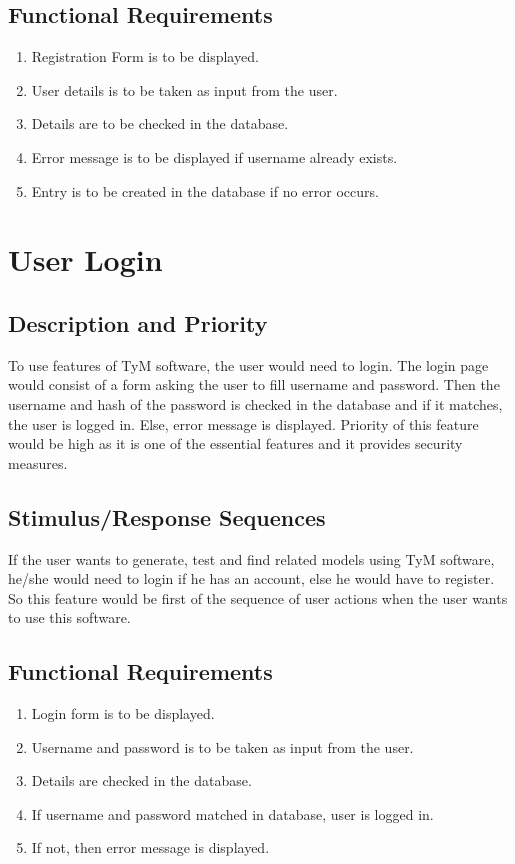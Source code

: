 \documentclass{scrreprt}
\begin{document}
\subsection{Functional Requirements}
\begin{enumerate}
\item Registration Form is to be displayed.
\item User details is to be taken as input from the user.
\item Details are to be checked in the database.
\item Error message is to be displayed if username already exists.
\item Entry is to be created in the database if no error occurs.
\end{enumerate}

\section{User Login}

\subsection{Description and Priority}
To use features of TyM software, the user would need to login. The login page would consist of a form asking the user to fill username and password. Then the username and hash of the password is checked in the database and if it matches, the user is logged in. Else, error message is displayed. Priority of this feature would be high as it is one of the essential features and it provides security measures.

\subsection{Stimulus/Response Sequences}
If the user wants to generate, test and find related models using TyM software, he/she would need to login if he has an account, else he would have to register. So this feature would be first of the sequence of user actions when the user wants to use this software.  

\subsection{Functional Requirements}
\begin{enumerate}
\item Login form is to be displayed.
\item Username and password is to be taken as input from the user.
\item Details are checked in the database.
\item If username and password matched in database, user is logged in.
\item If not, then error message is displayed.
\end{enumerate}
\end{document}

